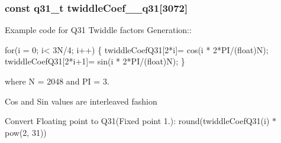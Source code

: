 \subsubsection[{\texorpdfstring{twiddle\+Coef\+\_\+2048\+\_\+q31}{twiddleCoef_2048_q31}}]{\setlength{\rightskip}{0pt plus 5cm}const q31\+\_\+t twiddle\+Coef\+\_\+\_\+q31\mbox{[}3072\mbox{]}}\hypertarget{group__CFFT__CIFFT_ga9c5767de9f5a409fd0c2027e6ac67179}{}\label{group__CFFT__CIFFT_ga9c5767de9f5a409fd0c2027e6ac67179}
\begin{DoxyParagraph}{}
Example code for Q31 Twiddle factors Generation\+:\+: 
\end{DoxyParagraph}
\begin{DoxyParagraph}{}

\begin{DoxyPre}for(i = 0; i< 3N/4; i++)
\{
   twiddleCoefQ31[2*i]= cos(i * 2*PI/(float)N);
   twiddleCoefQ31[2*i+1]= sin(i * 2*PI/(float)N);
\} \end{DoxyPre}
 
\end{DoxyParagraph}
\begin{DoxyParagraph}{}
where N = 2048 and PI = 3. 
\end{DoxyParagraph}
\begin{DoxyParagraph}{}
Cos and Sin values are interleaved fashion 
\end{DoxyParagraph}
\begin{DoxyParagraph}{}
Convert Floating point to Q31(Fixed point 1.)\+: round(twiddle\+Coef\+Q31(i) $\ast$ pow(2, 31)) 
\end{DoxyParagraph}
